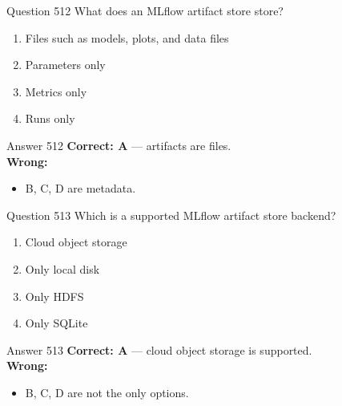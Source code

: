 \documentclass[aspectratio=169,11pt]{beamer}
\begin{document}
	\begin{frame}{Question 512}
		What does an MLflow artifact store store?
		\begin{enumerate}[label=\Alph*.]
			\item Files such as models, plots, and data files
			\item Parameters only
			\item Metrics only
			\item Runs only
		\end{enumerate}
	\end{frame}
	\begin{frame}{Answer 512}
		\textbf{Correct: A} --- artifacts are files.\\
		\vspace{0.5em}
		\textbf{Wrong:}
		\begin{itemize}
			\item B, C, D are metadata.
		\end{itemize}
	\end{frame}
	
	\begin{frame}{Question 513}
		Which is a supported MLflow artifact store backend?
		\begin{enumerate}[label=\Alph*.]
			\item Cloud object storage
			\item Only local disk
			\item Only HDFS
			\item Only SQLite
		\end{enumerate}
	\end{frame}
	\begin{frame}{Answer 513}
		\textbf{Correct: A} --- cloud object storage is supported.\\
		\vspace{0.5em}
		\textbf{Wrong:}
		\begin{itemize}
			\item B, C, D are not the only options.
		\end{itemize}
	\end{frame}
	
\end{document}
